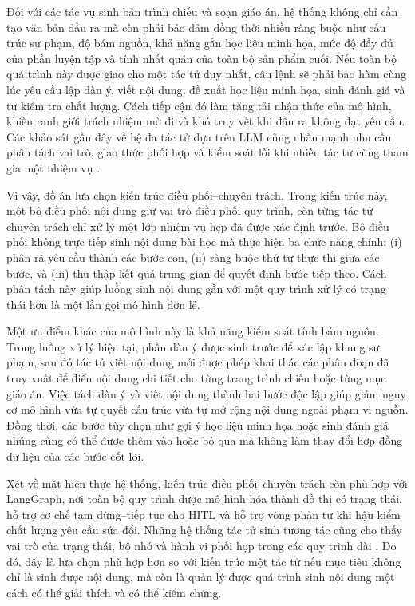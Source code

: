 \documentclass[../DoAn.tex]{subfiles}
\begin{document}
Đối với các tác vụ sinh bản trình chiếu và soạn giáo án, hệ thống không chỉ cần tạo văn bản đầu ra mà còn phải bảo đảm đồng thời nhiều ràng buộc như cấu trúc sư phạm, độ bám nguồn, khả năng gắn học liệu minh họa, mức độ đầy đủ của phần luyện tập và tính nhất quán của toàn bộ sản phẩm cuối. Nếu toàn bộ quá trình này được giao cho một tác tử duy nhất, câu lệnh sẽ phải bao hàm cùng lúc yêu cầu lập dàn ý, viết nội dung, đề xuất học liệu minh họa, sinh đánh giá và tự kiểm tra chất lượng. Cách tiếp cận đó làm tăng tải nhận thức của mô hình, khiến ranh giới trách nhiệm mờ đi và khó truy vết khi đầu ra không đạt yêu cầu. Các khảo sát gần đây về hệ đa tác tử dựa trên LLM cũng nhấn mạnh nhu cầu phân tách vai trò, giao thức phối hợp và kiểm soát lỗi khi nhiều tác tử cùng tham gia một nhiệm vụ \cite{guo2024multiagents}.

Vì vậy, đồ án lựa chọn kiến trúc điều phối--chuyên trách. Trong kiến trúc này, một bộ điều phối nội dung giữ vai trò điều phối quy trình, còn từng tác tử chuyên trách chỉ xử lý một lớp nhiệm vụ hẹp đã được xác định trước. Bộ điều phối không trực tiếp sinh nội dung bài học mà thực hiện ba chức năng chính: (i) phân rã yêu cầu thành các bước con, (ii) ràng buộc thứ tự thực thi giữa các bước, và (iii) thu thập kết quả trung gian để quyết định bước tiếp theo. Cách phân tách này giúp luồng sinh nội dung gần với một quy trình xử lý có trạng thái hơn là một lần gọi mô hình đơn lẻ.

Một ưu điểm khác của mô hình này là khả năng kiểm soát tính bám nguồn. Trong luồng xử lý hiện tại, phần dàn ý được sinh trước để xác lập khung sư phạm, sau đó tác tử viết nội dung mới được phép khai thác các phân đoạn đã truy xuất để điền nội dung chi tiết cho từng trang trình chiếu hoặc từng mục giáo án. Việc tách dàn ý và viết nội dung thành hai bước độc lập giúp giảm nguy cơ mô hình vừa tự quyết cấu trúc vừa tự mở rộng nội dung ngoài phạm vi nguồn. Đồng thời, các bước tùy chọn như gợi ý học liệu minh họa hoặc sinh đánh giá nhúng cũng có thể được thêm vào hoặc bỏ qua mà không làm thay đổi hợp đồng dữ liệu của các bước cốt lõi.

Xét về mặt hiện thực hệ thống, kiến trúc điều phối--chuyên trách còn phù hợp với LangGraph, nơi toàn bộ quy trình được mô hình hóa thành đồ thị có trạng thái, hỗ trợ cơ chế tạm dừng--tiếp tục cho HITL và hỗ trợ vòng phản tư khi hậu kiểm chất lượng yêu cầu sửa đổi. Những hệ thống tác tử sinh tương tác cũng cho thấy vai trò của trạng thái, bộ nhớ và hành vi phối hợp trong các quy trình dài \cite{park2023generativeagents}. Do đó, đây là lựa chọn phù hợp hơn so với kiến trúc một tác tử nếu mục tiêu không chỉ là sinh được nội dung, mà còn là quản lý được quá trình sinh nội dung một cách có thể giải thích và có thể kiểm chứng.
\end{document}
